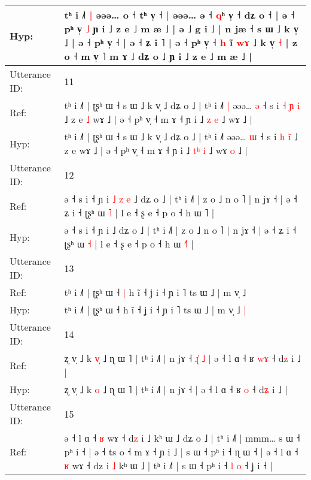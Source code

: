 \documentclass[10pt]{article}
\DeclareRobustCommand{\hl}[1]{{\textcolor{red}{#1}}}
\begin{document}
\begin{longtable}{ll}
Hyp: & tʰ i ˩˥\hl{ }\hl{|} əəə…\hl{}\hl{} o\hl{} ˧ tʰ v̩ ˧\hl{ }\hl{|} əəə… ə ˧ \hl{q}ʰ v̩ ˧ dʑ o ˧ | ə ˧ pʰ v̩ \hl{˩} ɲ i ˩ z e ˩ m æ ˩ | ə ˩ g i ˩ | n jæ ˧ s ɯ ˩ k v̩ ˩ | ə ˧ pʰ v̩ ˧ | ə ˧ ʑ i \hl{}˥ | ə ˧ pʰ v̩ ˧ \hl{h} i\hl{}\hl{}\hl{}\hl{}\hl{}\hl{}\hl{}\hl{}\hl{}\hl{}\hl{}\hl{}\hl{}\hl{}\hl{}\hl{}\hl{}\hl{}\hl{}\hl{}\hl{}\hl{}\hl{}\hl{̃} \hl{}\hl{w}\hl{ɤ} ˩ k v̩ \hl{˧} | z o ˧ m v̩ ˥\hl{}\hl{} m ɤ \hl{˩} dʑ o ˩ ɲ i ˩ z e ˩ m æ ˩ |
 \\
\midrule
Utterance ID: & 11 \\
Ref: & tʰ i ˩˥ | ʈʂʰ ɯ ˧ s ɯ ˩ k v̩ ˩ dʑ o ˩ | tʰ i ˩˥\hl{ }\hl{|} əəə… \hl{ə} ˧ s i \hl{˧} \hl{ɲ}\hl{ }\hl{i} ˩ z e\hl{ }\hl{˩} wɤ ˩ | ə ˧ pʰ v̩ ˧ m ɤ ˧ ɲ i ˩ \hl{}\hl{z} \hl{e} ˩ wɤ\hl{}\hl{} ˩ |
 \\
Hyp: & tʰ i ˩˥ | ʈʂʰ ɯ ˧ s ɯ ˩ k v̩ ˩ dʑ o ˩ | tʰ i ˩˥\hl{}\hl{} əəə… \hl{ɯ} ˧ s i \hl{h} \hl{}\hl{i}\hl{̃} ˩ z e\hl{}\hl{} wɤ ˩ | ə ˧ pʰ v̩ ˧ m ɤ ˧ ɲ i ˩ \hl{t}\hl{ʰ} \hl{i} ˩ wɤ\hl{ }\hl{o} ˩ |
 \\
\midrule
Utterance ID: & 12 \\
Ref: & ə ˧ s i ˧ ɲ i\hl{ }\hl{˩}\hl{ }\hl{z}\hl{ }\hl{e} ˩ dʑ o ˩ | tʰ i ˩˥ | z o ˩ n o ˥ | n jɤ ˧ | ə ˧ ʑ i ˧ ʈʂʰ ɯ \hl{˥} | l e ˧ ʂ e ˧ p o ˧ h ɯ \hl{}˥ |
 \\
Hyp: & ə ˧ s i ˧ ɲ i\hl{}\hl{}\hl{}\hl{}\hl{}\hl{} ˩ dʑ o ˩ | tʰ i ˩˥ | z o ˩ n o ˥ | n jɤ ˧ | ə ˧ ʑ i ˧ ʈʂʰ ɯ \hl{˧} | l e ˧ ʂ e ˧ p o ˧ h ɯ \hl{˧}˥ |
 \\
\midrule
Utterance ID: & 13 \\
Ref: & tʰ i ˩˥ | ʈʂʰ ɯ ˧\hl{ }\hl{|} h ĩ ˧ ʝ i ˧ ɲ i ˥ ts ɯ ˩ | m v̩ ˩\hl{}\hl{}
 \\
Hyp: & tʰ i ˩˥ | ʈʂʰ ɯ ˧\hl{}\hl{} h ĩ ˧ ʝ i ˧ ɲ i ˥ ts ɯ ˩ | m v̩ ˩\hl{ }\hl{|}
 \\
\midrule
Utterance ID: & 14 \\
Ref: & ʐ v̩ ˩ k \hl{v}\hl{̩} ˩ ɳ ɯ ˥ | tʰ i ˩˥ | n jɤ ˧\hl{ }\hl{ɻ}\hl{̍}\hl{ }\hl{˩} | ə ˧ l ɑ ˧ ʁ \hl{w}\hl{ɤ} ˧ d\hl{z} i ˩ |
 \\
Hyp: & ʐ v̩ ˩ k \hl{}\hl{o} ˩ ɳ ɯ ˥ | tʰ i ˩˥ | n jɤ ˧\hl{}\hl{}\hl{}\hl{}\hl{} | ə ˧ l ɑ ˧ ʁ \hl{}\hl{o} ˧ d\hl{ʑ} i ˩ |
 \\
\midrule
Utterance ID: & 15 \\
Ref: & ə ˧ l ɑ ˧\hl{ }\hl{ʁ} wɤ ˧ d\hl{z} i ˩ kʰ ɯ ˩ dʑ o ˩ | tʰ i ˩˥ | mmm… s ɯ ˧ pʰ i ˧ | ə ˧ ts o ˧ m ɤ ˧ ɲ i ˩\hl{ }\hl{|} s ɯ ˧ pʰ i ˧ ɳ ɯ ˧ | ə ˧ l ɑ ˧\hl{ }\hl{ʁ} wɤ ˧ dz \hl{i} \hl{˩} kʰ ɯ ˩ | tʰ i ˩˥ | s ɯ ˧ pʰ i ˧ \hl{l} \hl{o} ˧ ʝ i ˧ |
 \\

\end{longtable}
\end{document}
